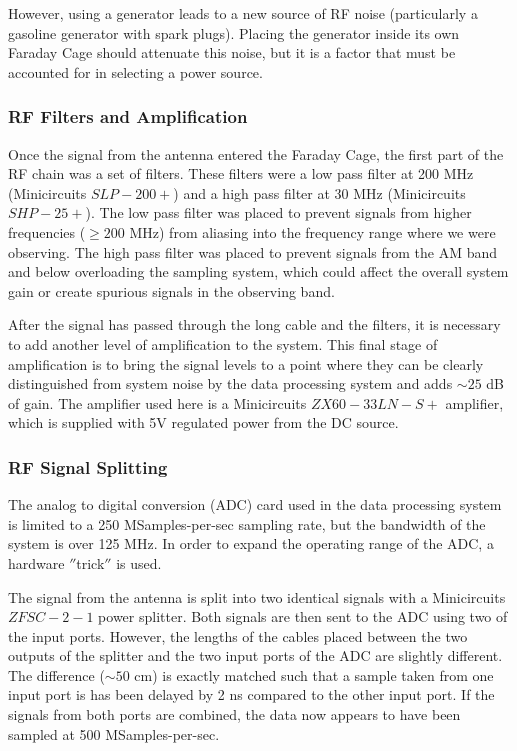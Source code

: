 However, using a generator leads to a new source of RF noise (particularly a gasoline generator with spark plugs). Placing the generator inside its own Faraday Cage should attenuate this noise, but it is a factor that must be accounted for in selecting a power source. 

\subsubsection{RF Filters and Amplification} \label{Sec:fcage_elec}
Once the signal from the antenna entered the Faraday Cage, the first part of the RF chain was a set of filters. These filters were a low pass filter at 200 MHz (Minicircuits $SLP-200+$) and a high pass filter at 30 MHz (Minicircuits $SHP-25+$). The low pass filter was placed to prevent signals from higher frequencies ($\geq 200$ MHz) from aliasing into the frequency range where we were observing. The high pass filter was placed to prevent signals from the AM band and below overloading the sampling system, which could affect the overall system gain or create spurious signals in the observing band. 

After the signal has passed through the long cable and the filters, it is necessary to add another level of amplification to the system. This final stage of amplification is to bring the signal levels to a point where they can be clearly distinguished from system noise by the data processing system and adds $\sim25$ dB of gain. The amplifier used here is a Minicircuits $ZX60-33LN-S+$ amplifier, which is supplied with 5V regulated power from the DC source. 

\subsubsection{RF Signal Splitting} \label{Sec:hard_split}
The analog to digital conversion (ADC) card used in the data processing system is limited to a 250 MSamples-per-sec sampling rate, but the bandwidth of the system is over 125 MHz. In order to expand the operating range of the ADC, a hardware $''$trick$''$ is used.

The signal from the antenna is split into two identical signals with a Minicircuits $ZFSC-2-1$ power splitter. Both signals are then sent to the ADC using two of the input ports. However, the lengths of the cables placed between the two outputs of the splitter and the two input ports of the ADC are slightly different. The difference ($\sim 50$ cm) is exactly matched such that a sample taken from one input port is has been delayed by 2 ns compared to the other input port. If the signals from both ports are combined, the data now appears to have been sampled at 500 MSamples-per-sec. 

